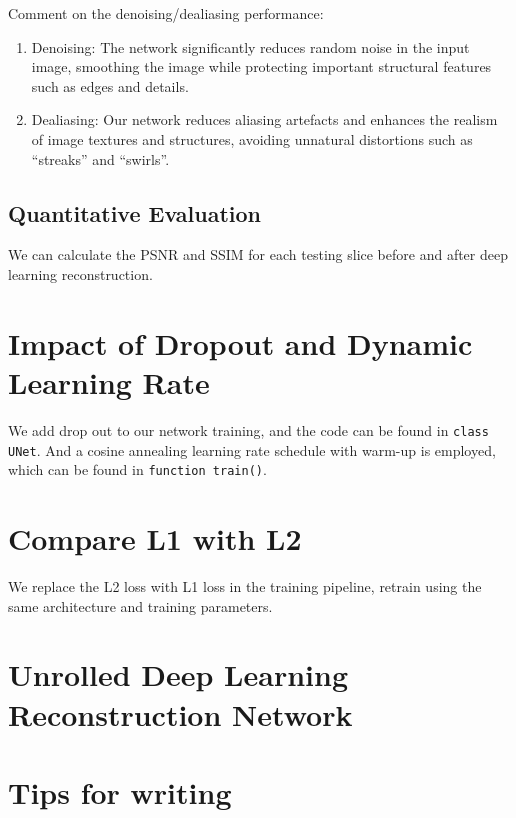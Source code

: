 \documentclass{article}
\begin{document}
Comment on the denoising/dealiasing performance:
\begin{enumerate} 
  \item Denoising: The network significantly reduces random noise in the input image,
        smoothing the image while protecting important structural features such as edges and details.
  \item Dealiasing: Our network reduces aliasing artefacts and enhances the realism of image
        textures and structures, avoiding unnatural distortions such as “streaks” and “swirls”.
\end{enumerate}

\subsection{Quantitative Evaluation}
We can calculate the PSNR and SSIM for each testing slice before and after deep
learning reconstruction. 



\section{Impact of Dropout and Dynamic Learning Rate}
We add drop out to our network training, and the code can be found in \texttt{class UNet}.
And a cosine annealing learning rate schedule with warm-up is employed, which can be
found in \texttt{function train()}.



\section{Compare L1 with L2}
We replace the L2 loss with L1 loss in the training pipeline,
retrain using the same architecture and training parameters.




\section{Unrolled Deep Learning Reconstruction Network}

\section{Tips for writing}
\label{tips}
\end{document}
